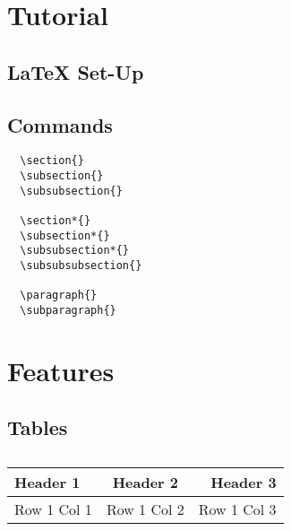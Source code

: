 
\section{Tutorial}

\subsection{\LaTeX{} Set-Up}
\subsection{Commands}
\begin{verbatim}
  \section{}
  \subsection{}
  \subsubsection{}

  \section*{}
  \subsection*{}
  \subsubsection*{}
  \subsubsubsection{}

  \paragraph{}
  \subparagraph{}
\end{verbatim}

\section{Features}
\subsection{Tables}


\begin{table}[h!]
  \centering
  \begin{tabular}{|l|c|r|}
    \hline
    Header 1 & Header 2 & Header 3 \\
    \hline
    Row 1 Col 1 & Row 1 Col 2 & Row 1 Col 3 \\
    \hline
  \end{tabular}
  \caption{}
\end{table}

